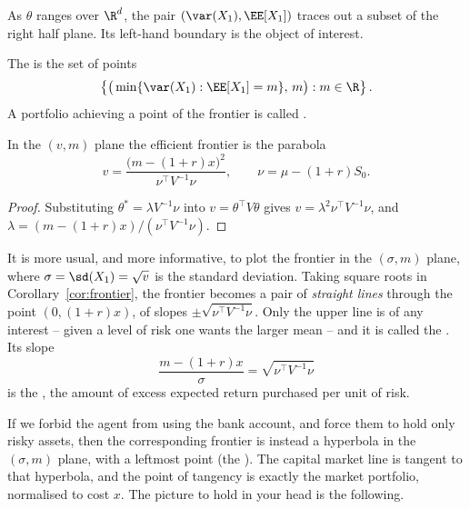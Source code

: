 As $\theta$ ranges over $\R^d$, the pair $(\var(X_1), \EE[X_1])$ traces out a subset of the right half plane. Its left-hand boundary is the object of interest.

\begin{definition}
	The  is the set of points
	$$
	\left\{ \big(\min\{\var(X_1) : \EE[X_1] = m\},\, m\big) : m \in \R \right\}.
	$$
	A portfolio achieving a point of the frontier is called .
\end{definition}

\begin{corollary}\label{cor:frontier}
	In the $(v,m)$ plane the efficient frontier is the parabola
	$$
	v = \frac{\big(m - (1+r)x\big)^2}{\nu^\top V^{-1}\nu}, \qquad \nu = \mu - (1+r)S_0.
	$$
\end{corollary}

\begin{proof}
	Substituting $\theta^* = \lambda V^{-1}\nu$ into $v = \theta^\top V\theta$ gives $v = \lambda^2 \nu^\top V^{-1}\nu$, and $\lambda = (m - (1+r)x)/(\nu^\top V^{-1}\nu)$.
\end{proof}

It is more usual, and more informative, to plot the frontier in the $(\sigma, m)$ plane, where $\sigma = \sd(X_1) = \sqrt{v}$ is the standard deviation. Taking square roots in Corollary~\ref{cor:frontier}, the frontier becomes a pair of \emph{straight lines} through the point $(0, (1+r)x)$, of slopes $\pm\sqrt{\nu^\top V^{-1}\nu}$. Only the upper line is of any interest -- given a level of risk one wants the larger mean -- and it is called the . Its slope
$$
\frac{m - (1+r)x}{\sigma} = \sqrt{\nu^\top V^{-1}\nu}
$$
is the , the amount of excess expected return purchased per unit of risk.

If we forbid the agent from using the bank account, and force them to hold only risky assets, then the corresponding frontier is instead a hyperbola in the $(\sigma,m)$ plane, with a leftmost point (the ). The capital market line is tangent to that hyperbola, and the point of tangency is exactly the market portfolio, normalised to cost $x$. The picture to hold in your head is the following.

